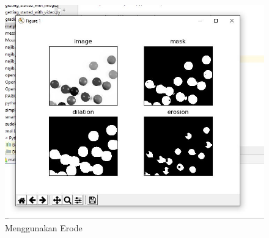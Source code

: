 \begin{figure}[ht]
\centering
\includegraphics[scale=0.6]{figures/2,54.jpg}
\caption{Menggunakan Erode}
\label{contoh}
\end{figure}







\newpage
